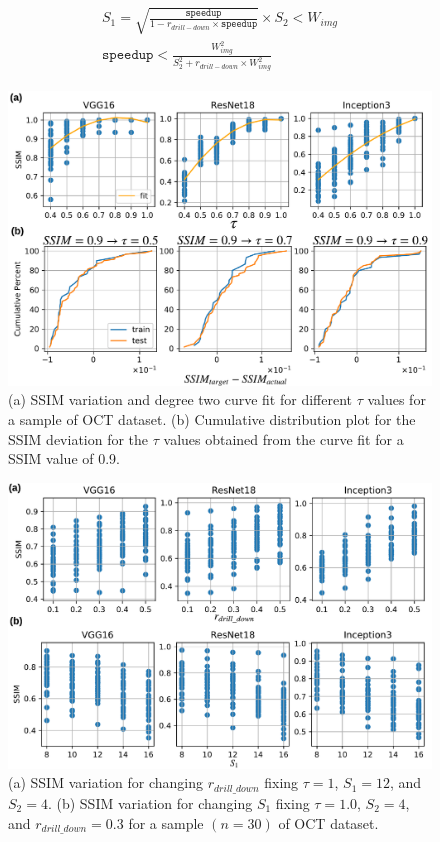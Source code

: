 \begin{align}
\label{eqn:speedup_bound}
\begin{split}
S_1 = \sqrt{\frac{\texttt{speedup}}{1 - r_{drill-down} \times \texttt{speedup}}} \times S_2 < W_{img}\\
\texttt{speedup} < \frac{W^2_{img}}{S^2_2+r_{drill-down}\times W^2_{img}}
\end{split}
\end{align}


\begin{figure}[t]
\includegraphics[width=\columnwidth]{images/system_tuning}
\caption{(a) SSIM variation and degree two curve fit for different $\tau$ values for a sample of OCT dataset. (b) Cumulative distribution plot for the SSIM deviation for the $\tau$ values obtained from the curve fit for a SSIM value of 0.9.}
\label{fig:system_tuning}
\end{figure}

\begin{figure}[t]
\includegraphics[width=\columnwidth]{images/adaptive_ssim}
\caption{(a) SSIM variation for changing $r_{drill\_down}$ fixing $\tau=1$, $S_1=12$, and $S_2=4$. (b) SSIM variation for changing $S_1$ fixing $\tau=1.0$, $S_2=4$, and $r_{drill\_down}=0.3$ for a sample $(n=30)$ of OCT dataset.}
\label{fig:adaptive_ssim}
\end{figure}

